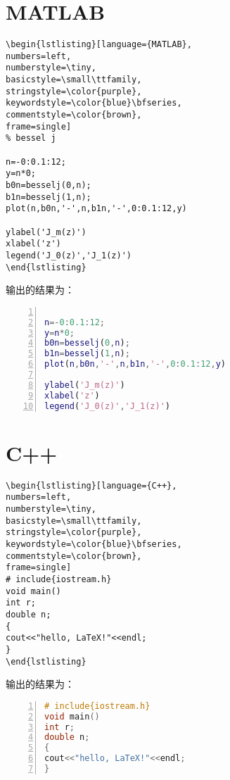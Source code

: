 \section{MATLAB}
\begin{verbatim}
\begin{lstlisting}[language={MATLAB},
numbers=left,
numberstyle=\tiny,
basicstyle=\small\ttfamily,
stringstyle=\color{purple},
keywordstyle=\color{blue}\bfseries,
commentstyle=\color{brown},
frame=single]
% bessel j

n=-0:0.1:12;
y=n*0;
b0n=besselj(0,n);
b1n=besselj(1,n);
plot(n,b0n,'-',n,b1n,'-',0:0.1:12,y)

ylabel('J_m(z)')
xlabel('z')
legend('J_0(z)','J_1(z)')
\end{lstlisting}
\end{verbatim}
输出的结果为：
\begin{lstlisting}[language={MATLAB},
numbers=left,
numberstyle=\tiny,
basicstyle=\small\ttfamily,
stringstyle=\color{purple},
keywordstyle=\color{blue}\bfseries,
commentstyle=\color{brown},
frame=single]
% bessel j

n=-0:0.1:12;
y=n*0;
b0n=besselj(0,n);
b1n=besselj(1,n);
plot(n,b0n,'-',n,b1n,'-',0:0.1:12,y)

ylabel('J_m(z)')
xlabel('z')
legend('J_0(z)','J_1(z)')
\end{lstlisting}

\section{C++}
\begin{verbatim}
\begin{lstlisting}[language={C++},
numbers=left,
numberstyle=\tiny,
basicstyle=\small\ttfamily,
stringstyle=\color{purple},
keywordstyle=\color{blue}\bfseries,
commentstyle=\color{brown},
frame=single]
# include{iostream.h}
void main()
int r;
double n;
{
cout<<"hello, LaTeX!"<<endl;
}
\end{lstlisting}
\end{verbatim}
输出的结果为：
\begin{lstlisting}[language={C++},
numbers=left,
numberstyle=\tiny,
basicstyle=\small\ttfamily,
stringstyle=\color{purple},
keywordstyle=\color{blue}\bfseries,
commentstyle=\color{brown},
frame=single]
# include{iostream.h}
void main()
int r;
double n;
{
cout<<"hello, LaTeX!"<<endl;
}
\end{lstlisting}
